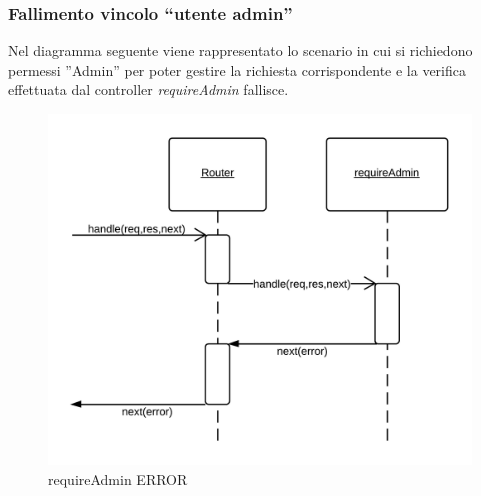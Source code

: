 \subsubsection{Fallimento vincolo ``utente admin''}
Nel diagramma seguente viene rappresentato lo scenario in cui si richiedono permessi ''Admin'' per poter gestire la richiesta corrispondente e la verifica effettuata dal controller \emph{requireAdmin} fallisce. 
\begin{figure}[H]
	\begin{center} 
		\includegraphics[scale=0.20]{scenari/requireAdmin ERROR.png} 
		\caption{requireAdmin ERROR}
	\end{center} 
\end{figure}


